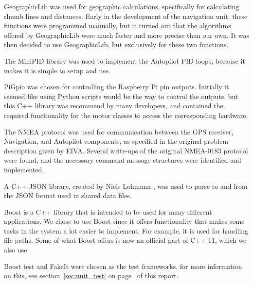 GeographicLib \cite{geographiclib} was used for geographic calculations, specifically for calculating rhumb lines and distances. Early in the development of the navigation unit, these functions were programmed manually, but it turned out that the algorithms offered by GeographicLib were much faster and more precise than our own. It was then decided to use GeographicLib, but exclusively for these two functions.

The MiniPID \cite{minipid} library was used to implement the Autopilot PID loops, because it makes it is simple to setup and use.

PiGpio \cite{pigpio} was chosen for controlling the Raspberry Pi pin outputs. Initially it seemed like using Python scripts would be the way to control the outputs, but this C++ library was recommend by many developers, and contained the required functionality for the motor classes to access the corresponding hardware.

The NMEA \cite{NMEA} protocol was used for communication between the GPS receiver, Navigation, and Autopilot components, as specified in the original problem description given by EIVA. Several write-ups of the original NMEA-0183 protocol were found, and the necessary command message structures were identified and implemented.

A C++ JSON library, created by Niels Lohmann \cite{json}, was used to parse to and from the JSON format \cite{jsobjectnotation} used in shared data files.

Boost is a C++ library that is intended to be used for many different applications\cite{boost}. We chose to use Boost since it offers functionality that makes some tasks in the system a lot easier to implement. For example, it is used for handling file paths. Some of what Boost offers is now an official part of C++ 11, which we also use.

Boost test and FakeIt \cite{fakeit} were chosen as the test frameworks, for more information on this, see section~\ref{sec:unit_test} on page~\pageref{sec:unit_test} of this report.